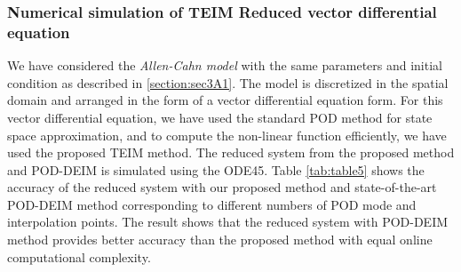 \documentclass{article}
\begin{document}
\subsubsection{Numerical simulation of TEIM Reduced vector differential equation}
We have considered the \emph{Allen-Cahn model} with the same parameters and initial condition as described in \ref{section:sec3A1}. The model is discretized in the spatial domain and arranged
in the form of a vector differential equation form. For this vector
differential equation, we have used the standard POD method \cite{Antoulas} for state space approximation, and
to compute the non-linear function efficiently, we have used
the proposed TEIM method. The reduced system from the proposed method and POD-DEIM is simulated using the ODE45. Table \ref{tab:table5} shows the accuracy
of the reduced system with our proposed method and state-of-the-art POD-DEIM method \cite{DEIM} corresponding to different numbers of POD mode and interpolation points. The result shows that the reduced system with POD-DEIM method provides better accuracy than the proposed method with equal online computational complexity.
\end{document}
